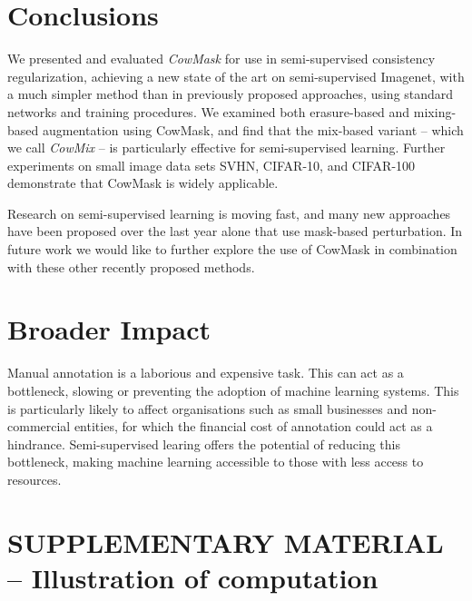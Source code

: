 \documentclass{article}
\begin{document}
\section{Conclusions}
\label{sec:conclusions}
We presented and evaluated \emph{CowMask} for use in semi-supervised consistency regularization, achieving a new state of the art on semi-supervised Imagenet, with a much simpler method than in previously proposed approaches, using standard networks and training procedures.  We examined both erasure-based and mixing-based augmentation using CowMask, and find that the mix-based variant -- which we call \emph{CowMix} -- is particularly effective for semi-supervised learning. Further experiments on small image data sets SVHN, CIFAR-10, and CIFAR-100 demonstrate that CowMask is widely applicable.

Research on semi-supervised learning is moving fast, and many new approaches have been proposed over the last year alone that use mask-based perturbation. In future work we would like to further explore the use of CowMask in combination with these other recently proposed methods.










\section*{Broader Impact}

Manual annotation is a laborious and expensive task.
This can act as a bottleneck, slowing or preventing the adoption of machine learning systems.
This is particularly likely to affect organisations such as small businesses and non-commercial entities, for which
the financial cost of annotation could act as a hindrance.
Semi-supervised learing offers the potential of reducing this bottleneck, making machine learning accessible to those
with less access to resources.













\section*{SUPPLEMENTARY MATERIAL -- Illustration of computation}
\end{document}
